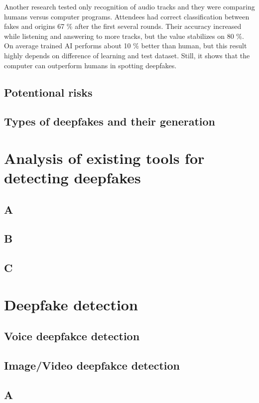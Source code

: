Another research tested only recognition of audio tracks and they were comparing humans versus computer programs. Attendees had correct classification between fakes and origins 67 \% after the first several rounds. Their accuracy increased while listening and answering to more tracks, but the value stabilizes on 80 \%. On average trained AI performs about 10 \% better than human, but this result highly depends on difference of learning and test dataset. Still, it shows that the computer can outperform humans in spotting deepfakes. \cite{HumanPerceptionAudio}

\section{Potentional risks}

\cite{DawnOfTextDependentSociety}
\cite{IncreasingThreatofDeepfakeIdentites}

\section{Types of deepfakes and their generation}

\chapter{Analysis of existing tools for detecting deepfakes}
\section{A}
\section{B}
\section{C}

\chapter{Deepfake detection}
\section{Voice deepfakce detection}
\section{Image/Video deepfakce detection}
\section{A}
